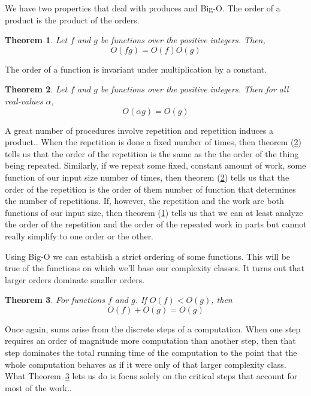 \documentclass[]{tufte-handout}
\newtheorem{theorem}{Theorem}
\begin{document}
We have two properties that deal with produces and Big-O. The order of a product is the product of the orders.
\begin{theorem}
Let $f$ and $g$ be functions over the positive integers. Then,
\[
O(fg) = O(f)O(g)
\]
\label{th:mult}
\end{theorem}
The order of a function is invariant under multiplication by a constant.
\begin{theorem}
Let $f$ and $g$ be functions over the positive integers. Then for all real-values $\alpha$,
\[
O(\alpha g) = O(g)
\]
\label{th:constmult}
\end{theorem}
A great number of procedures involve repetition and repetition induces a product.. When the repetition is done a fixed number of times, then theorem (\ref{th:constmult}) tells us that the order of the repetition is the same as the the order of the thing being repeated. Similarly, if we repeat some fixed, constant amount of work, some function of our input size number of times, then theorem (\ref{th:constmult}) tells us that the order of the repetition is the order of them number of function that determines the number of repetitions. If, however, the repetition and the work are both functions of our input size, then theorem (\ref{th:mult}) tells us that we can at least analyze the order of the repetition and the order of the repeated work in parts but cannot really simplify to one order or the other.


Using Big-O we can establish a strict ordering of some functions. This will be true of the functions on which we'll base our complexity classes. It turns out that larger orders dominate smaller orders.
\begin{theorem}
For functions $f$ and $g$. If $O(f) < O(g)$, then
\[
O(f) + O(g) = O(g)
\]
\label{th:order}
\end{theorem}
Once again, sums arise from the discrete steps of a computation. When one step requires an order of magnitude more computation than another step, then that step dominates the total running time of the computation to the point that the whole computation behaves as if it were only of that larger complexity class. What Theorem~\ref{th:order} lets us do is focus solely on the critical steps that account for most of the work..
\end{document}
